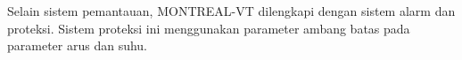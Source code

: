 \documentclass{elsinta}
\begin{document}
Selain sistem pemantauan, MONTREAL-VT dilengkapi dengan
sistem alarm dan proteksi. Sistem proteksi ini menggunakan
parameter ambang batas pada parameter arus dan suhu.




\subsection{\NonFunctionalSpecTitle}


\end{document}
